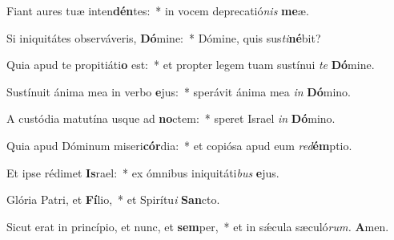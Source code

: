 \item Fiant aures tuæ inten\textbf{dén}tes:~* in vocem deprecatió\textit{nis} \textbf{me}æ.
\item Si iniquitátes observáveris, \textbf{Dó}mine:~* Dómine, quis sus\hspace{0.02em}\textit{ti}\textbf{né}bit?
\item Quia apud te propitiáti\textbf{o} est:~* et propter legem tuam sustínui \textit{te} \textbf{Dó}mine.
\item Sustínuit ánima mea in verbo \textbf{e}jus:~* sperávit ánima mea \textit{in} \textbf{Dó}mino.
\item A custódia matutína usque ad \textbf{no}ctem:~* speret Israel \textit{in} \textbf{Dó}mino.
\item Quia apud Dóminum miseri\textbf{cór}dia:~* et copiósa apud eum \textit{red}\textbf{ém}ptio.
\item Et ipse rédimet \textbf{Is}rael:~* ex ómnibus iniquitáti\hspace*{0.02em}\textit{bus} \textbf{e}jus.
\item Glória Patri, et \textbf{Fí}lio,~* et Spirítu\tinyhspace\textit{i} \textbf{San}cto.
\item Sicut erat in princípio, et nunc, et \textbf{sem}per,~* et in sǽcula sæculó\textit{rum.} \textbf{A}men.